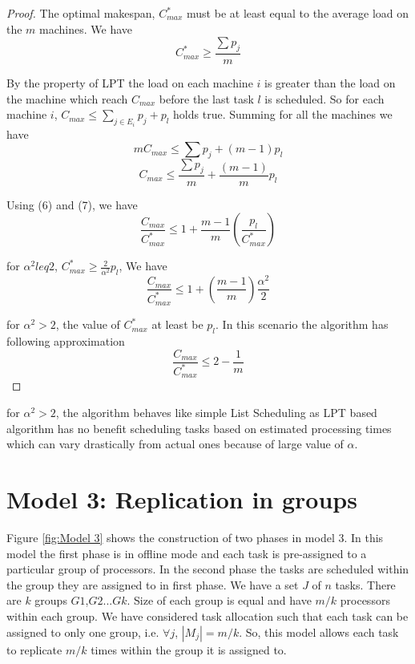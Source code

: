 \documentclass[10pt, conference, compsocconf]{IEEEtran}
\begin{document}
\begin{proof}
The optimal makespan, $C_{max}^{*}$ must be at least equal to the average load on the $m$ machines. We have\\
\begin{equation}
C_{max}^{*}\geq\frac{\sum p_j}{m}
\end{equation}

By the property of LPT the load on each machine $i$ is greater than the load on the machine which reach $C_{max}$ before the last task $l$ is scheduled. So for each machine $i$, $C_{max} \leq  \sum_{j \in E_i}^{}{p_j} + p_l$ holds true.  Summing for all the machines we have
\begin{equation}\nonumber 
mC_{max} \leq  \sum {p_j} + (m-1)p_l
\end{equation}
\begin{equation}
C_{max} \leq  \frac{\sum {p_j}}{m} + \frac{(m-1)}{m}p_l
\end{equation}

Using (6) and (7), we have
\begin{equation}\nonumber
\frac{C_{max}}{C_{max}^{*}} \leq 1 + {\frac{m-1}{m}}\left(\frac{p_l}{C_{max}^{*}}\right)
\end{equation}

for $\alpha^2 leq 2$, $C_{max}^{*} \geq {\frac{2}{\alpha^{2}}} p_l $, We have 
\begin{equation}\nonumber
\frac{C_{max}}{C_{max}^{*}} \leq 1 + \left(\frac{m-1}{m}\right)\frac{\alpha^{2}}{2}
\end{equation}

for $\alpha^2 > 2$, the value of $C_{max}^{*} $  at least be $p_l$. In this scenario the algorithm has following approximation
\begin{equation}\nonumber
\frac{C_{max}}{C_{max}^{*}} \leq 2- \frac{1}{m}
\end{equation}
\end{proof}  

for $\alpha^2 > 2$, the algorithm behaves like simple List Scheduling as LPT based algorithm  has no benefit scheduling tasks based on estimated processing times which can vary drastically from actual ones because of large value of $\alpha$. 



\section{Model 3: Replication in groups}
Figure \ref{fig:Model 3} shows the construction of two phases in model 3.  In this model the first phase is in offline mode and each task is pre-assigned to a particular  group of processors. In the second phase the tasks are scheduled  within the group they are assigned to in first phase.   We have a set $J$ of $ n$ tasks.  There are $k$ groups $G1$,$G2$...$Gk$.   Size of each group is equal and have $m/k$ processors within each group.  We have considered task allocation such that each task can be assigned to only one group, i.e. $\forall j$, $|M_j|= m/k$. So, this model allows each task to replicate $ m/k $ times within the group it is assigned to.
\end{document}
